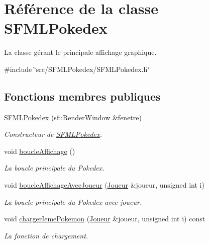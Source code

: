 \hypertarget{class_s_f_m_l_pokedex}{}\section{Référence de la classe S\+F\+M\+L\+Pokedex}
\label{class_s_f_m_l_pokedex}


La classe gérant le principale affichage graphique.  




{\ttfamily \#include \char`\"{}src/\+S\+F\+M\+L\+Pokedex/\+S\+F\+M\+L\+Pokedex.\+h\char`\"{}}

\subsection*{Fonctions membres publiques}
\begin{DoxyCompactItemize}
\item 
\hyperlink{class_s_f_m_l_pokedex_a94d68bf080f6b2503fa8e867663a4b2b}{S\+F\+M\+L\+Pokedex} (sf\+::\+Render\+Window \&fenetre)
\begin{DoxyCompactList}\small\item\em Constructeur de \hyperlink{class_s_f_m_l_pokedex}{S\+F\+M\+L\+Pokedex}. \end{DoxyCompactList}\item 
void \hyperlink{class_s_f_m_l_pokedex_a7caf472eeb1060d9ce88c7cf3cb4bbb8}{boucle\+Affichage} ()
\begin{DoxyCompactList}\small\item\em La boucle principale du Pokedex. \end{DoxyCompactList}\item 
void \hyperlink{class_s_f_m_l_pokedex_a0b447d5b74964d395264d6d5e50aadbd}{boucle\+Affichage\+Avec\+Joueur} (\hyperlink{class_joueur}{Joueur} \&joueur, unsigned int i)
\begin{DoxyCompactList}\small\item\em La boucle principale du Pokedex avec joueur. \end{DoxyCompactList}\item 
void \hyperlink{class_s_f_m_l_pokedex_af47eb49ddd0c3651f390b45b6697c2d2}{charger\+Ieme\+Pokemon} (\hyperlink{class_joueur}{Joueur} \&joueur, unsigned int i) const
\begin{DoxyCompactList}\small\item\em La fonction de chargement. \end{DoxyCompactList}\end{DoxyCompactItemize}
